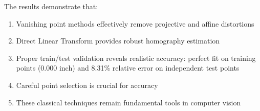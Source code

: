 The results demonstrate that:
\begin{enumerate}
    \item Vanishing point methods effectively remove projective and affine distortions
    \item Direct Linear Transform provides robust homography estimation
    \item Proper train/test validation reveals realistic accuracy: perfect fit on training points (0.000 inch) and 8.31\% relative error on independent test points
    \item Careful point selection is crucial for accuracy
    \item These classical techniques remain fundamental tools in computer vision
\end{enumerate}